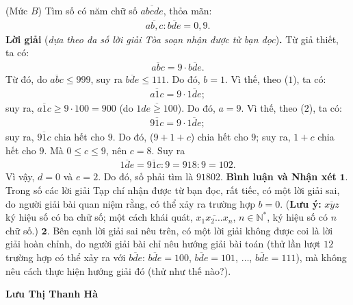 \begin{multicols}{2}
	\setlength{\abovedisplayskip}{4pt}
	\setlength{\belowdisplayskip}{4pt}
	{}
	(Mức $B$) Tìm số có năm chữ số  $\overline{abcde}$, thỏa mãn:
	\begin{align*}
		\overline {ab,c} :\overline {bde}  = 0,9.
	\end{align*}
	\textbf{\color{thachthuctoanhoc}Lời giải} (\textit{dựa theo đa số lời giải Tòa soạn nhận được từ bạn đọc})\textbf{\color{thachthuctoanhoc}.}
	\vskip 0.05cm
	Từ giả thiết, ta có:
	\begin{align*}
		\overline{abc} = 9 \cdot \overline{bde}. \tag{$1$}
	\end{align*}
	Từ đó, do $\overline{abc} \le 999$,  suy ra $\overline{bde} \le 111$. Do đó, $b = 1$. Vì thế, theo ($1$), ta có:
	\begin{align*}
		\overline{a1c} = 9 \cdot \overline{1de};\tag{$2$}
	\end{align*}
	suy ra, $\overline{a1c} \ge 9 \cdot 100 = 900$  (do $\overline{1de \ge 100}$). Do đó, $a = 9$. Vì thế, theo ($2$), ta có:
	\begin{align*}
		\overline{91c} = 9\cdot \overline{1de};
	\end{align*}
	suy ra, $\overline{91c}$ chia hết cho $9$. Do đó, ($9 + 1 + c$) chia hết cho $9$; suy ra, $1 + c$ chia hết cho $9$. Mà $0 \le c \le 9$, nên $c = 8$. Suy ra
	\begin{align*}
		\overline {1de}  = \overline {91c} :9 = 918:9 = 102.
	\end{align*}
	Vì vậy, $d = 0$ và $e = 2$. Do đó, số phải tìm là $91802$.
	\vskip 0.05cm
	\textbf{\color{thachthuctoanhoc}Bình luận và Nhận xét}
	\vskip 0.05cm
	$\pmb{1.}$ Trong số các lời giải Tạp chí nhận được từ bạn đọc, rất tiếc, có một lời giải sai, do người giải bài quan niệm rằng, có thể xảy ra trường hợp $b = 0$.
	\vskip 0.05cm
	(\textbf{\color{thachthuctoanhoc}Lưu ý:} $\overline{xyz}$  ký hiệu số có ba chữ số; một cách khái quát,  $\overline {{x_1}{x_2} \ldots {x_n}} $, $n \in \mathbb{N^*}$, ký hiệu số có $n$ chữ số.)
	\vskip 0.05cm
	$\pmb{2.}$ Bên cạnh lời giải sai nêu trên, có một lời giải không được coi là lời giải hoàn chỉnh, do người giải bài chỉ nêu hướng giải bài toán (thử lần lượt $12$ trường hợp có thể xảy ra với $\overline{bde}$: $\overline{bde}= 100$, $\overline{bde} = 101$,    $\ldots$, $\overline{bde}= 111$), mà không nêu cách thực hiện hướng giải đó (thử như thế nào?).
	\begin{flushright}
		\textbf{\color{thachthuctoanhoc}Lưu Thị Thanh Hà}

\end{flushright}
\end{multicols}
